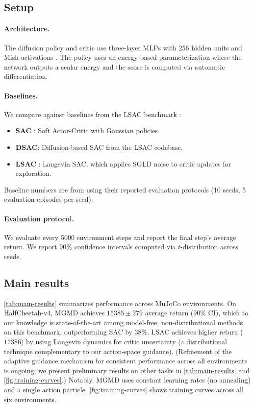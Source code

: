 \documentclass{article}
\theoremstyle{plain}
\theoremstyle{definition}
\theoremstyle{remark}
\begin{document}
\subsection{Setup}

\paragraph{Architecture.}
The diffusion policy and critic use three-layer MLPs with 256 hidden units and Mish activations \citep{misra2019mish}.
The policy uses an energy-based parameterization where the network outputs a scalar energy and the score is computed via automatic differentiation.

\paragraph{Baselines.}
We compare against baselines from the LSAC benchmark \citep{lsac2025}:
\begin{itemize}
  \item \textbf{SAC} \citep{haarnoja2018sac}: Soft Actor-Critic with Gaussian policies.
  \item \textbf{DSAC}: Diffusion-based SAC from the LSAC codebase.
  \item \textbf{LSAC} \citep{lsac2025}: Langevin SAC, which applies SGLD noise to critic updates for exploration.
\end{itemize}
Baseline numbers are from \citet{lsac2025} using their reported evaluation protocols (10 seeds, 5 evaluation episodes per seed).

\paragraph{Evaluation protocol.}
We evaluate every 5000 environment steps and report the final step's average return.
We report 90\% confidence intervals computed via $t$-distribution across seeds.

\subsection{Main results}

\cref{tab:main-results} summarizes performance across MuJoCo environments.
On HalfCheetah-v4, MGMD achieves $15385 \pm 279$ average return (90\% CI), which to our knowledge is state-of-the-art among model-free, non-distributional methods on this benchmark, outperforming SAC by 38\%.
LSAC achieves higher return ($17386$) by using Langevin dynamics for critic uncertainty (a distributional technique complementary to our action-space guidance).
(Refinement of the adaptive guidance mechanism for consistent performance across all environments is ongoing; we present preliminary results on other tasks in \cref{tab:main-results} and \cref{fig:training-curves}.)
Notably, MGMD uses constant learning rates (no annealing) and a single action particle.
\cref{fig:training-curves} shows training curves across all six environments.
\end{document}
